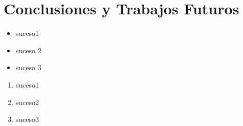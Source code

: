 \section{Conclusiones y Trabajos Futuros}
\begin{itemize}
    \item suceso1
    \item suceso 2
    \item suceso 3
\end{itemize}

\begin{enumerate}
    \item suceso1
    \item suceso2
    \item suceso3
\end{enumerate}